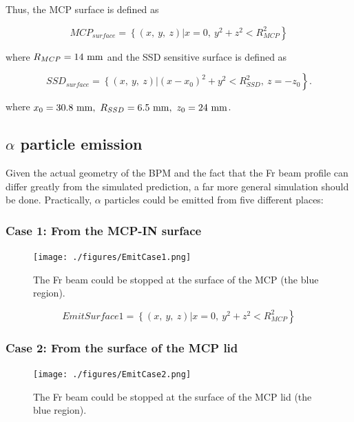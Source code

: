 \documentclass{article}
\begin{document}
Thus, the MCP surface is defined as

$$
MCP_{surface} = \left\{ (x,~y,~z) \right| \left. x = 0,~y^2 + z^2 < R_{MCP}^2 \right\}
$$

where $R_{MCP} = 14~{\rm mm}$ and the SSD sensitive surface is defined as

$$
SSD_{surface} = \left\{ (x,~y,~z) \right| \left. (x - x_0)^2 + y^2 < R_{SSD}^2,~z = -z_0 \right\}.
$$

where $x_0 = 30.8~{\rm mm},~R_{SSD} = 6.5~{\rm mm},~z_0 = 24~{\rm mm}$.



\subsection{$\alpha$ particle emission}

Given the actual geometry of the BPM and the fact that the Fr beam profile can differ greatly from the simulated prediction, a far more general simulation should be done. Practically, $\alpha$ particles could be emitted from five different places:

\subsubsection{Case 1: From the MCP-IN surface}

\begin{figure}[H]
  \begin{center}
    \texttt{[image: ./figures/EmitCase1.png]}
	  \caption{The Fr beam could be stopped at the surface of the MCP (the blue region).}
    \label{fig:EmitCase1}
  \end{center}
\end{figure}

$$
EmitSurface1 = \left\{ (x,~y,~z) \right| \left. x = 0,~y^2+z^2 < R_{MCP}^2 \right\}
$$

\subsubsection{Case 2: From the surface of the MCP lid}

\begin{figure}[H]
  \begin{center}
    \texttt{[image: ./figures/EmitCase2.png]}
	  \caption{The Fr beam could be stopped at the surface of the MCP lid (the blue region).}
    \label{fig:EmitCase2}
  \end{center}
\end{figure}
\end{document}
